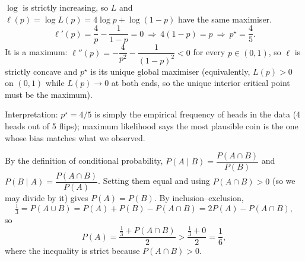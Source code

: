 \begin{solution}
$\log$ is strictly increasing, so $L$ and $\ell(p)=\log L(p)=4\log p+\log(1-p)$ have the same maximiser.
\[
\ell'(p)=\frac4p-\frac1{1-p}=0\ \Longrightarrow\ 4(1-p)=p\ \Longrightarrow\ p^\star=\frac45 .
\]
It is a maximum: $\ell''(p)=-\dfrac4{p^2}-\dfrac1{(1-p)^2}<0$ for every $p\in(0,1)$, so $\ell$ is strictly
concave and $p^\star$ is its unique global maximiser (equivalently, $L(p)>0$ on $(0,1)$ while
$L(p)\to0$ at both ends, so the unique interior critical point must be the maximum).

Interpretation: $p^\star=4/5$ is simply the empirical frequency of heads in the data (4 heads out of 5 flips);
maximum likelihood says the most plausible coin is the one whose bias matches what we observed.
\end{solution}

\begin{solution}
By the definition of conditional probability,
$P(A\mid B)=\dfrac{P(A\cap B)}{P(B)}$ and $P(B\mid A)=\dfrac{P(A\cap B)}{P(A)}$.
Setting them equal and using $P(A\cap B)>0$ (so we may divide by it) gives $P(A)=P(B)$.
By inclusion--exclusion,
\[
\tfrac13=P(A\cup B)=P(A)+P(B)-P(A\cap B)=2P(A)-P(A\cap B),
\]
so
\[
P(A)=\frac{\tfrac13+P(A\cap B)}{2}>\frac{\tfrac13+0}{2}=\frac16 ,
\]
where the inequality is strict because $P(A\cap B)>0$.
\end{solution}

